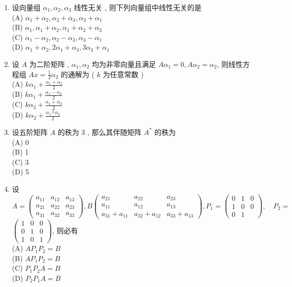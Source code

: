\documentclass[10pt]{article}
\begin{document}
{\begin{enumerate}
  \item  设向量组  $\alpha_{1}, \alpha_{2}, \alpha_{3}$  线性无关 ,  则下列向量组中线性无关的是 \\
(A) $\alpha_{1}+\alpha_{2}, \alpha_{2}+\alpha_{3}, \alpha_{3}+\alpha_{1}$\\
(B) $\alpha_{1}, \alpha_{1}+\alpha_{2}, \alpha_{1}+\alpha_{2}+\alpha_{3}$\\
(C) $\alpha_{1}-\alpha_{2}, \alpha_{2}-\alpha_{3}, \alpha_{3}-\alpha_{1}$\\
(D) $\alpha_{1}+\alpha_{2}, 2 \alpha_{1}+\alpha_{3}, 3 \alpha_{3}+\alpha_{1}$

  \item  设  $A$  为二阶矩阵 , $\alpha_{1}, \alpha_{2}$  均为非零向量且满足  $A \alpha_{1}=0, A \alpha_{2}=\alpha_{2}$,  则线性方程组  $A x=\frac{1}{2} \alpha_{2}$  的通解为  ( $k$  为任意常数 )\\
(A) $k \alpha_{1}+\frac{\alpha_{1}+\alpha_{2}}{2}$\\
(B) $k \alpha_{1}+\frac{\alpha_{1}-\alpha_{2}}{2}$\\
(C) $k \alpha_{2}+\frac{\alpha_{1}+\alpha_{2}}{2}$\\
(D) $k \alpha_{2}+\frac{\alpha_{1} \stackrel{2}{-} \alpha_{2}}{2}$

  \item  设五阶矩阵  $A$  的秩为  3 ,  那么其伴随矩阵  $A^{*}$  的秩为 \\
(A) 0\\
(B) 1\\
(C) 3\\
(D) 5

  \item  设  $A=\left(\begin{array}{lll}a_{11} & a_{12} & a_{13} \\ a_{21} & a_{22} & a_{23} \\ a_{31} & a_{32} & a_{33}\end{array}\right), B\left(\begin{array}{ccc}a_{21} & a_{22} & a_{23} \\ a_{11} & a_{12} & a_{13} \\ a_{31}+a_{11} & a_{32}+a_{12} & a_{33}+a_{13}\end{array}\right), P_{1}=\left(\begin{array}{ccc}0 & 1 & 0 \\ 1 & 0 & 0 \\ 0 & 1\end{array}\right), \quad P_{2}=$ $\left(\begin{array}{lll}1 & 0 & 0 \\ 0 & 1 & 0 \\ 1 & 0 & 1\end{array}\right)$,  则必有 \\
(A) $A P_{1} P_{2}=B$\\
(B) $A P_{1} P_{2}=B$\\
(C) $P_{1} P_{2} A=B$\\
(D) $P_{2} P_{1} A=B$


\end{enumerate}}
\end{document}

